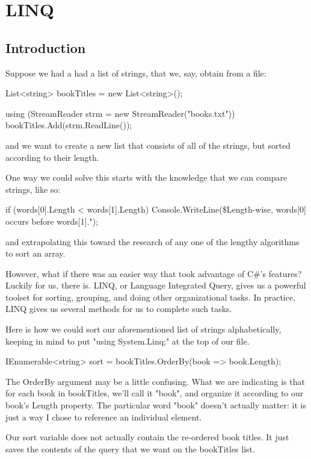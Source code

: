 \documentclass[oneside, openany] {book}
\begin{document}
\chapter{LINQ}
\minitoc
\section{Introduction}
Suppose we had a had a list of strings, that we, say, obtain from a file:
\begin{CSharp}
List<string> bookTitles = new List<string>();

using (StreamReader strm = new StreamReader("books.txt"))
{
 bookTitles.Add(strm.ReadLine());
}
\end{CSharp}

and we want to create a new list that consists of all of the strings, but sorted according to their length.

One way we could solve this starts with the knowledge that we can compare strings, like so:
\begin{CSharp}
if (words[0].Length < words[1].Length)
{
  Console.WriteLine(\$Length-wise, {words[0]} occurs before {words[1]}.");
}
\end{CSharp}
and extrapolating this toward the research of any one of the lengthy algorithms to sort an array.

However, what if there was an easier way that took advantage of C\#'s features? Luckily for us, there is.
LINQ, or Language Integrated Query, gives us a powerful toolset for sorting, grouping, and doing other organizational tasks. In practice, LINQ gives us several methods for us to complete such tasks.

Here is how we could sort our aforementioned list of strings alphabetically, keeping in mind to put "using System.Linq;" at the top of our file.
\begin{CSharp}
IEnumerable<string> sort = bookTitles.OrderBy(book => book.Length);
\end{CSharp}
The OrderBy argument may be a little confusing. What we are indicating is that for each book in bookTitles, we'll call it "book", and organize it according to our book's Length property. The particular word "book" doesn't actually matter: it is just a way I chose to reference an individual element.

Our sort variable does not actually contain the re-ordered book titles. It just saves the contents of the query that we want on the bookTitles list.
\end{document}
